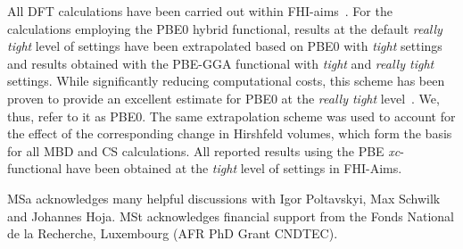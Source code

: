 \documentclass[aps,prl,groupaddress, twocolumn]{revtex4-1}  %
\begin{document}
All DFT calculations have been carried out within FHI-aims~\cite{fhi_aims}. For the calculations employing the PBE0 hybrid functional, results at the default \emph{really tight} level of settings have been extrapolated based on PBE0 with \emph{tight} settings and results obtained with the PBE-GGA functional with \emph{tight} and \emph{really tight} settings. While significantly reducing computational costs, this scheme has been proven to provide an excellent estimate for PBE0 at the \emph{really tight} level~\cite{Hoja2018}. We, thus, refer to it as PBE0. The same extrapolation scheme was used to account for the effect of the corresponding change in Hirshfeld volumes, which form the basis for all MBD and CS calculations. All reported results using the PBE \textit{xc}-functional have been obtained at the \emph{tight} level of settings in FHI-Aims.

\begin{acknowledgements}
 MSa acknowledges many helpful discussions with Igor Poltavskyi, Max Schwilk and Johannes Hoja.
 MSt acknowledges financial support from the Fonds National de la Recherche, Luxembourg (AFR PhD Grant CNDTEC).
\end{acknowledgements}


\end{document}
